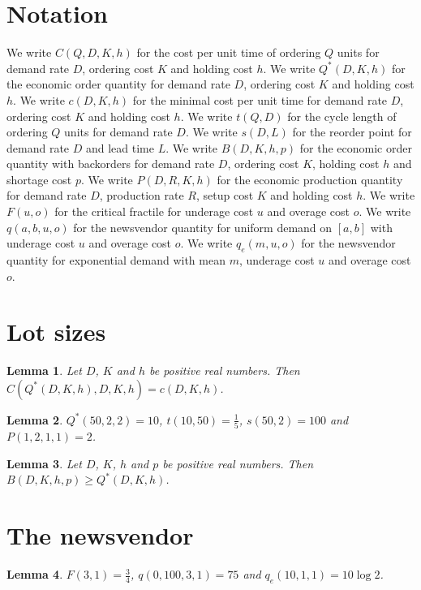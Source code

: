 \documentclass{article}
\newtheorem{lemma}{Lemma}
\begin{document}
\section{Notation}

We write $C(Q,D,K,h)$ for the cost per unit time of ordering $Q$ units for demand rate $D$, ordering cost $K$ and holding cost $h$.
We write $Q^*(D,K,h)$ for the economic order quantity for demand rate $D$, ordering cost $K$ and holding cost $h$.
We write $c(D,K,h)$ for the minimal cost per unit time for demand rate $D$, ordering cost $K$ and holding cost $h$.
We write $t(Q,D)$ for the cycle length of ordering $Q$ units for demand rate $D$.
We write $s(D,L)$ for the reorder point for demand rate $D$ and lead time $L$.
We write $B(D,K,h,p)$ for the economic order quantity with backorders for demand rate $D$, ordering cost $K$, holding cost $h$ and shortage cost $p$.
We write $P(D,R,K,h)$ for the economic production quantity for demand rate $D$, production rate $R$, setup cost $K$ and holding cost $h$.
We write $F(u,o)$ for the critical fractile for underage cost $u$ and overage cost $o$.
We write $q(a,b,u,o)$ for the newsvendor quantity for uniform demand on $[a,b]$ with underage cost $u$ and overage cost $o$.
We write $q_e(m,u,o)$ for the newsvendor quantity for exponential demand with mean $m$, underage cost $u$ and overage cost $o$.

\section{Lot sizes}

\begin{lemma}\label{harris}
Let $D$, $K$ and $h$ be positive real numbers. Then $C(Q^*(D,K,h),D,K,h)=c(D,K,h)$.
\end{lemma}

\begin{lemma}\label{example}
$Q^*(50,2,2)=10$, $t(10,50)=\frac15$, $s(50,2)=100$ and $P(1,2,1,1)=2$.
\end{lemma}

\begin{lemma}\label{backorders}
Let $D$, $K$, $h$ and $p$ be positive real numbers. Then $B(D,K,h,p)\ge Q^*(D,K,h)$.
\end{lemma}

\section{The newsvendor}

\begin{lemma}\label{newsvendor}
$F(3,1)=\frac34$, $q(0,100,3,1)=75$ and $q_e(10,1,1)=10\log 2$.
\end{lemma}
\end{document}

